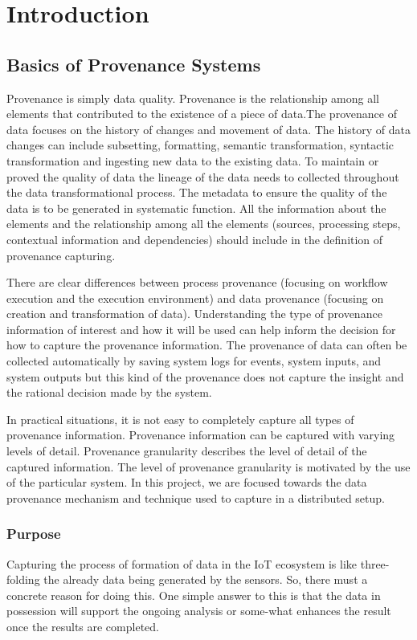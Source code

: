 \chapter{Introduction}




\section{Basics of Provenance Systems}
Provenance is simply data quality. Provenance is the relationship among all elements that contributed to the existence of a piece of data.The provenance of data focuses on the history of changes and movement of data. The history of data changes can include subsetting, formatting, semantic transformation, syntactic transformation and ingesting new data to the existing data. To maintain or proved the quality of data the lineage of the data needs to collected throughout the data transformational process. The metadata to ensure the quality of the data is to be generated in systematic function. All the information about the elements and the relationship among all the elements (sources, processing steps, contextual information and dependencies) should include in the definition of provenance capturing. 


There are clear differences between process provenance (focusing on workflow execution and the execution environment) and data provenance (focusing on creation and transformation of data). Understanding the type of provenance information of interest and how it will be used can help inform the decision for how to capture the provenance information. The provenance of data can often be collected automatically by saving system logs for events, system inputs, and system outputs but this kind of the provenance does not capture the insight and the rational decision made by the system. 

In practical situations, it is not easy to completely capture all types of provenance information. Provenance information can be captured with varying levels of detail.  Provenance granularity describes the level of detail of the captured information. The level of provenance granularity is motivated by the use of the particular system. In this project, we are focused towards the data provenance mechanism and technique used to capture in a distributed setup.

\subsection{Purpose}
Capturing the process of formation of data in the IoT ecosystem is like three-folding the already data being generated by the sensors. So, there must a concrete reason for doing this. One simple answer to this is that the data in possession will support the ongoing analysis or some-what enhances the result once the results are completed.

